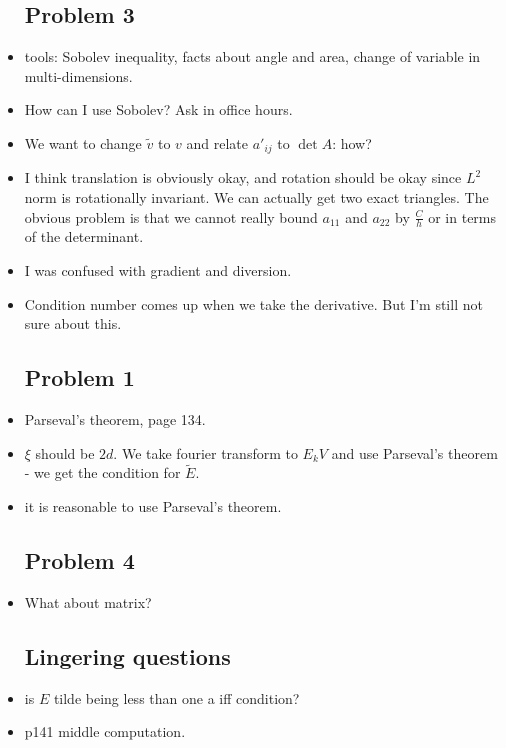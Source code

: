 \documentclass{article}
\theoremstyle{remark}
\begin{document}
\begin{itemize}
\subsection*{Problem 3}
\item tools: Sobolev inequality, facts about angle and area, change of variable in multi-dimensions.
\item How can I use Sobolev? Ask in office hours.
\item We want to change $\tilde v$ to $v$ and relate $a'_{ij}$ to $\det A$: how?
\item I think translation is obviously okay, and rotation should be okay since $L^2$ norm is rotationally invariant. We can actually get two exact triangles. The obvious problem is that we cannot really bound $a_{11}$ and $a_{22}$ by $\frac Ch$ or in terms of the determinant.
\item I was confused with gradient and diversion.
\item Condition number comes up when we take the derivative. But I'm still not sure about this.
\subsection*{Problem 1}
\item Parseval's theorem, page 134.
\item $\xi$ should be $2d$. We take fourier transform to $E_k V$ and use Parseval's theorem - we get the condition for $\tilde E$.
\item it is reasonable to use Parseval's theorem.

    
    
\subsection*{Problem 4}
\item What about matrix?


\subsection*{Lingering questions}
\item is $E$ tilde being less than one a iff condition?
\item p141 middle computation.

    
\end{itemize}
\end{document}
